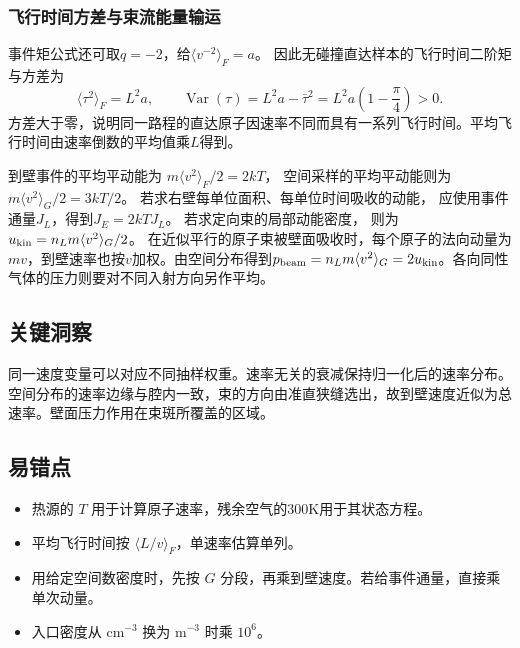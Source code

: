 \documentclass[UTF8,fontset=fandol,a4paper,11pt]{ctexart}
\begin{document}
\subsubsection*{飞行时间方差与束流能量输运}
事件矩公式还可取$q=-2$，给$\langle v^{-2}\rangle_F=a$。
因此无碰撞直达样本的飞行时间二阶矩与方差为
\[
\langle\tau^2\rangle_F=L^2a,\qquad
\operatorname{Var}(\tau)=L^2a-\bar\tau^2
=L^2a\left(1-\frac\pi4\right)>0.
\]
方差大于零，说明同一路程的直达原子因速率不同而具有一系列飞行时间。平均飞行时间由速率倒数的平均值乘$L$得到。

到壁事件的平均平动能为
$m\langle v^2\rangle_F/2=2kT$，
空间采样的平均平动能则为
$m\langle v^2\rangle_G/2=3kT/2$。
若求右壁每单位面积、每单位时间吸收的动能，
应使用事件通量$J_L$，得到$J_E=2kT J_L$。
若求定向束的局部动能密度，
则为$u_{\rm kin}=n_Lm\langle v^2\rangle_G/2$。
在近似平行的原子束被壁面吸收时，每个原子的法向动量为$mv$，到壁速率也按$v$加权。由空间分布得到$p_{\rm beam}=n_Lm\langle v^2\rangle_G=2u_{\rm kin}$。各向同性气体的压力则要对不同入射方向另作平均。





\subsection*{关键洞察}

同一速度变量可以对应不同抽样权重。速率无关的衰减保持归一化后的速率分布。空间分布的速率边缘与腔内一致，束的方向由准直狭缝选出，故到壁速度近似为总速率。壁面压力作用在束斑所覆盖的区域。



\subsection*{易错点}

\begin{itemize}
\item 热源的 $T$ 用于计算原子速率，残余空气的300K用于其状态方程。
\item 平均飞行时间按 $\langle L/v\rangle_F$，单速率估算单列。
\item 用给定空间数密度时，先按 $G$ 分段，再乘到壁速度。若给事件通量，直接乘单次动量。
\item 入口密度从 $\mathrm{cm^{-3}}$ 换为 $\mathrm{m^{-3}}$ 时乘 $10^6$。
\end{itemize}
\end{document}
